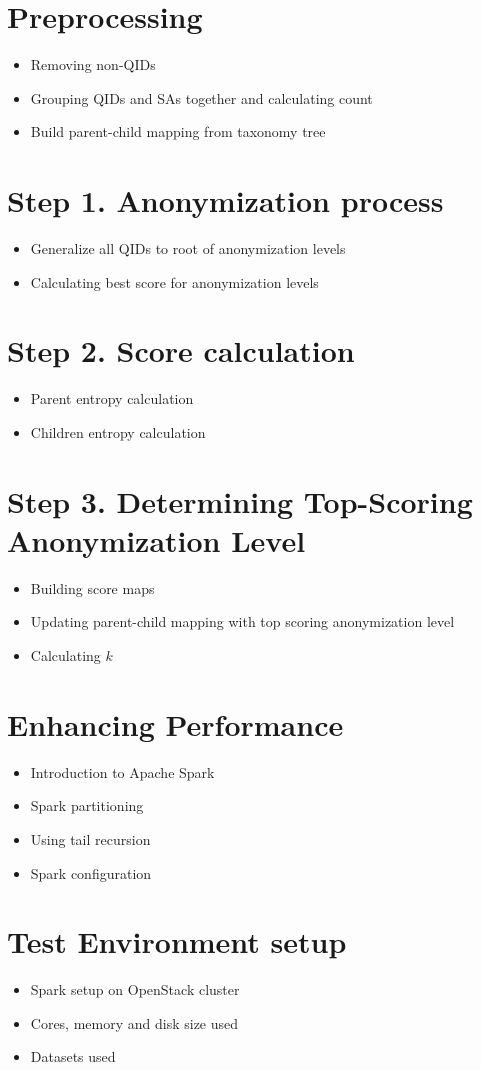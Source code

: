 \documentclass[11pt]{article}       %
\newenvironment{slide}[1]        {\section{#1} \begin{itemize}}%
                                 {\end{itemize}}
\begin{document}
\begin{slide}{Preprocessing}
\item Removing non-QIDs
\item Grouping QIDs and SAs together and calculating count
\item Build parent-child mapping from taxonomy tree
\end{slide}

\begin{slide}{Step 1. Anonymization process}
\item Generalize all QIDs to root of anonymization levels
\item Calculating best score for anonymization levels
\end{slide}

\begin{slide}{Step 2. Score calculation}
\item Parent entropy calculation
\item Children entropy calculation
\end{slide}

\begin{slide}{Step 3. Determining Top-Scoring Anonymization Level}
\item Building score maps
\item Updating parent-child mapping with top scoring anonymization level
\item Calculating $k$
\end{slide}

\begin{slide}{Enhancing Performance}
\item Introduction to Apache Spark
\item Spark partitioning
\item Using tail recursion
\item Spark configuration
\end{slide}

\begin{slide}{Test Environment setup}
\item Spark setup on OpenStack cluster
\item Cores, memory and disk size used
\item Datasets used
\end{slide}
\end{document}
